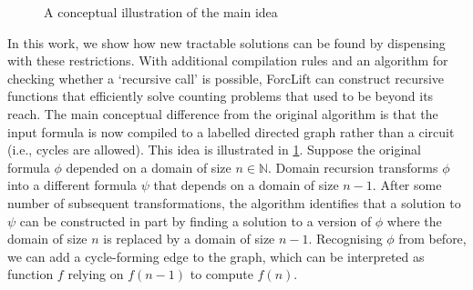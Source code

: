 \documentclass{article}
\begin{document}


\begin{figure}[t]
  \centering
  \caption{A conceptual illustration of the main idea}
  \label{fig:idea}
\end{figure}

In this work, we show how new tractable solutions can be found by dispensing with these restrictions. With additional compilation rules and an algorithm for checking whether a `recursive call' is possible, ForcLift \citep{DBLP:conf/ijcai/BroeckTMDR11} can construct recursive functions that efficiently solve counting problems that used to be beyond its reach. The main conceptual difference from the original algorithm is that the input formula is now compiled to a labelled directed graph rather than a circuit (i.e., cycles are allowed). This idea is illustrated in \cref{fig:idea}. Suppose the original formula $\phi$ depended on a domain of size $n \in \mathbb{N}$. Domain recursion transforms $\phi$ into a different formula $\psi$ that depends on a domain of size $n-1$. After some number of subsequent transformations, the algorithm identifies that a solution to $\psi$ can be constructed in part by finding a solution to a version of $\phi$ where the domain of size $n$ is replaced by a domain of size $n-1$. Recognising $\phi$ from before, we can add a cycle-forming edge to the graph, which can be interpreted as function $f$ relying on $f(n-1)$ to compute $f(n)$.
\end{document}
